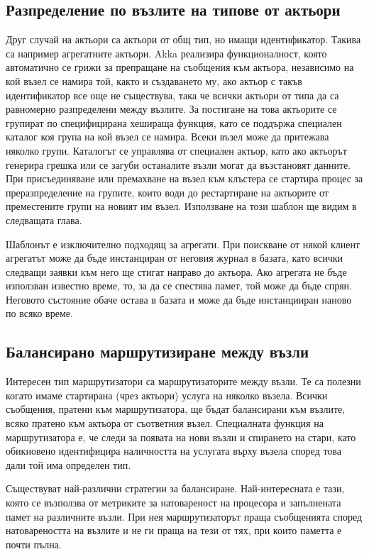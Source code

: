 \subsection{Разпределение по възлите на типове от актьори}
\label{sec:cluster-sharding}

Друг случай на  актьори са актьори от общ тип, но имащи идентификатор. Такива са например агрегатните актьори. Akka реализира функционалност, която автоматично се грижи за препращане на съобщения към актьора, независимо на кой възел се намира той, както и създаването му, ако актьор с такъв идентификатор все още не съществува, така че всички актьори от типа да са равномерно разпределени между възлите. За постигане на това актьорите се групират по специфицирана хешираща функция, като се поддържа специален каталог коя група на кой възел се намира. Всеки възел може да притежава няколко групи. Каталогът се управлява от специален  актьор, като ако актьорът генерира грешка или се загуби останалите възли могат да възстановят данните. При присъединяване или премахване на възел към клъстера се стартира процес за преразпределение на групите, които води до рестартиране на актьорите от преместените групи на новият им възел. Използване на този шаблон ще видим в следващата глава.

Шаблонът е изключително подходящ за агрегати. При поискване от някой клиент агрегатът може да бъде инстанциран от неговия журнал в базата, като всички следващи заявки към него ще стигат направо до актьора. Ако агрегата не бъде използван известно време, то, за да се спестява памет, той може да бъде спрян. Неговото състояние обаче остава в базата и може да бъде инстанцииран наново по всяко време.

\subsection{Балансирано маршрутизиране между възли}
\label{sec:node-routers}

Интересен тип маршрутизатори са маршрутизаторите между възли. Те са полезни когато имаме стартирана (чрез актьори) услуга на няколко възела. Всички съобщения, пратени към маршрутизатора, ще бъдат балансирани към възлите, всяко пратено към актьора от съответния възел. Специалната функция на маршрутизатора е, че следи за появата на нови възли и спирането на стари, като обикновено идентифицира наличността на услугата върху възела според това дали той има определен тип.

Съществуват най-различни стратегии за балансиране. Най-интересната е тази, която се възползва от метриките за натовареност на процесора и запълнената памет на различните възли. При нея маршрутизаторът праща съобщенията според натовареността на възлите и не ги праща на тези от тях, при които паметта е почти пълна.

